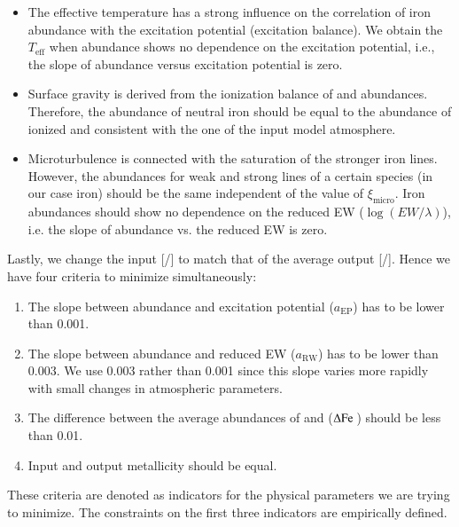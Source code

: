 \documentclass{aa}
\begin{document}
\begin{itemize}
    \item The effective temperature has a strong influence on the correlation
          of iron abundance with the excitation potential (excitation balance).
          We obtain the $T_\mathrm{eff}$ when  abundance shows no
          dependence on the excitation potential, i.e., the slope of abundance
          versus excitation potential is zero.
    \item Surface gravity is derived from the ionization balance of 
          and  abundances. Therefore, the abundance of neutral iron
          should be equal to the abundance of ionized and consistent with the
          one of the input model atmosphere.
    \item Microturbulence is connected with the saturation of the stronger iron
          lines. However, the abundances for weak and strong lines of a certain
          species (in our case iron) should be the same independent of the value
          of $\xi_\mathrm{micro}$. Iron abundances should show no dependence on
          the reduced EW ($\log(EW/\lambda)$), i.e. the slope of abundance vs.
          the reduced EW is zero.
\end{itemize}
Lastly, we change the input [/] to match
that of the average output [/]. Hence we have four criteria to
minimize simultaneously:

\begin{enumerate}
    \item The slope between abundance and excitation potential ($a_\mathrm{EP}$)
          has to be lower than 0.001.
    \item The slope between abundance and reduced EW ($a_\mathrm{RW}$) has to be
          lower than 0.003. We use 0.003 rather than 0.001 since this slope
          varies more rapidly with small changes in atmospheric parameters.
    \item The difference between the average abundances of  and
           ($\Delta\ion{Fe}{}$) should be less than 0.01.
    \item Input and output metallicity should be equal.
\end{enumerate}
These criteria are denoted as indicators for the physical parameters we are
trying to minimize. The constraints on the first three indicators are
empirically defined.
\end{document}
